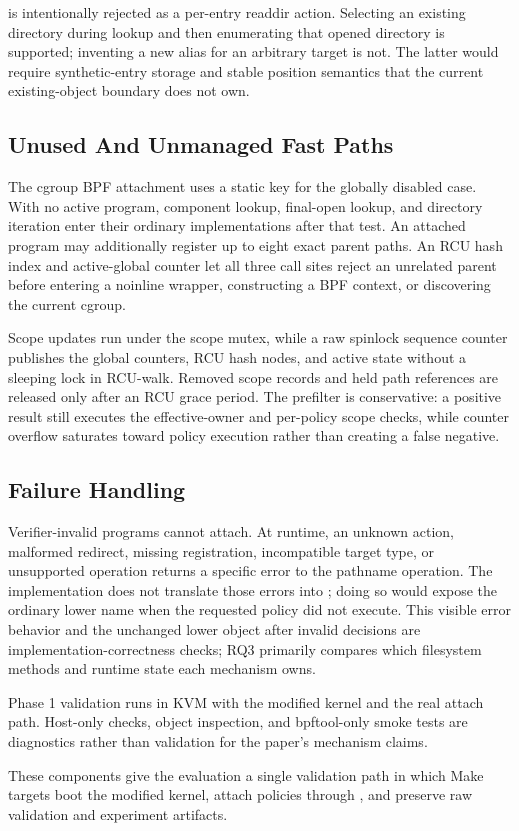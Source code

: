  is intentionally rejected as a per-entry readdir action.
Selecting an existing directory during lookup and then enumerating that opened
directory is supported; inventing a new alias for an arbitrary target is not.
The latter would require synthetic-entry storage and stable position semantics
that the current existing-object boundary does not own.

\subsection{Unused And Unmanaged Fast Paths}

The cgroup BPF attachment uses a static key for the globally disabled case.
With no active program, component lookup, final-open lookup, and directory
iteration enter their ordinary implementations after that test. An attached
program may additionally register up to eight exact parent paths. An RCU hash
index and active-global counter let all three call sites reject an unrelated
parent before entering a noinline wrapper, constructing a BPF context, or
discovering the current cgroup.

Scope updates run under the scope mutex, while a raw spinlock sequence counter
publishes the global counters, RCU hash nodes, and active state without a
sleeping lock in RCU-walk. Removed scope records and held path references are
released only after an RCU grace period. The prefilter is conservative: a
positive result still executes the effective-owner and per-policy scope checks,
while counter overflow saturates toward policy execution rather than creating a
false negative.

\subsection{Failure Handling}

Verifier-invalid programs cannot attach. At runtime, an unknown action,
malformed redirect, missing registration, incompatible target type, or
unsupported operation returns a specific error to the pathname operation. The
implementation does not translate those errors into ; doing so
would expose the ordinary lower name when the requested policy did not execute.
This visible error behavior and the unchanged lower object after invalid
decisions are implementation-correctness checks; RQ3 primarily compares which
filesystem methods and runtime state each mechanism owns.

Phase 1 validation runs in KVM with the modified kernel and the real
 attach path. Host-only checks, object inspection, and
bpftool-only smoke tests are diagnostics rather than validation for the paper's
mechanism claims.

These components give the evaluation a single validation path in which Make
targets boot the modified kernel, attach policies through
, and preserve raw validation and experiment artifacts.
